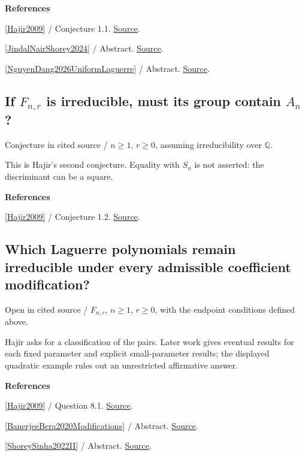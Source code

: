 \documentclass[11pt,a4paper,oneside,openany]{book}
\newenvironment{sources}{\par\smallskip\begingroup\footnotesize\color{atlasgray}\leftskip=10pt\setlength{\parskip}{2pt}}{\par\endgroup\smallskip}
\begin{document}
\begin{sources}
\textbf{References}\par\smallskip
\noindent\hyperlink{ref:Hajir2009}{[Hajir2009]} / Conjecture 1.1.  \href{https://doi.org/10.4153/CJM-2009-031-6}{Source}.\par
\noindent\hyperlink{ref:JindalNairShorey2024}{[JindalNairShorey2024]} / Abstract.  \href{https://doi.org/10.5486/PMD.2024.9906}{Source}.\par
\noindent\hyperlink{ref:NguyenDang2026UniformLaguerre}{[NguyenDang2026UniformLaguerre]} / Abstract.  \href{https://hexagonmath.org/2611.00087v1}{Source}.\par
\end{sources}\color{black}
\subsection*{If \(F_{n,r}\) is irreducible, must its group contain \(A_n\)?}
{\small\sffamily\color{atlasgold}Conjecture in cited source / \(n\ge1\), \(r\ge0\), assuming irreducibility over \(\mathbb Q\).}\par\smallskip
\color{black} This is Hajir's second conjecture. Equality with \(S_n\) is not asserted: the discriminant can be a square.\par
\begin{sources}
\textbf{References}\par\smallskip
\noindent\hyperlink{ref:Hajir2009}{[Hajir2009]} / Conjecture 1.2.  \href{https://doi.org/10.4153/CJM-2009-031-6}{Source}.\par
\end{sources}\color{black}
\subsection*{Which Laguerre polynomials remain irreducible under every admissible coefficient modification?}
{\small\sffamily\color{atlasgold}Open in cited source / \(F_{n,r}\), \(n\ge1\), \(r\ge0\), with the endpoint conditions defined above.}\par\smallskip
\color{black} Hajir asks for a classification of the pairs. Later work gives eventual results for each fixed parameter and explicit small-parameter results; the displayed quadratic example rules out an unrestricted affirmative answer.\par
\begin{sources}
\textbf{References}\par\smallskip
\noindent\hyperlink{ref:Hajir2009}{[Hajir2009]} / Question 8.1.  \href{https://doi.org/10.4153/CJM-2009-031-6}{Source}.\par
\noindent\hyperlink{ref:BanerjeeBera2020Modifications}{[BanerjeeBera2020Modifications]} / Abstract.  \href{https://doi.org/10.1142/S1793042120500530}{Source}.\par
\noindent\hyperlink{ref:ShoreySinha2022II}{[ShoreySinha2022II]} / Abstract.  \href{https://doi.org/10.1016/j.indag.2022.03.001}{Source}.\par
\end{sources}\color{black}
\end{document}
